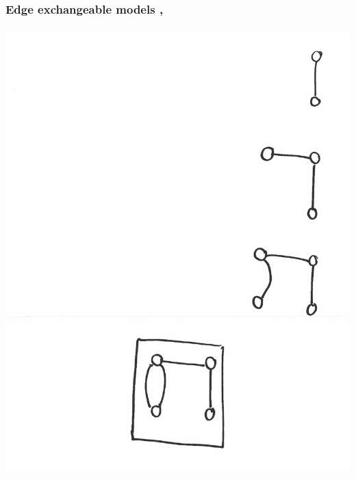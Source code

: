 \documentclass[final,hyperref={pdfpagelabels=false},noamsthm]{beamer}
\begin{document}
\begin{frame}
	\frametitle{Edge exchangeable models \cite{cai2016}, \cite{CraneDempsey2017}}
	\includegraphics[angle=90,origin=c,scale=0.4]{fig/ee2}
\end{frame}
\end{document}
